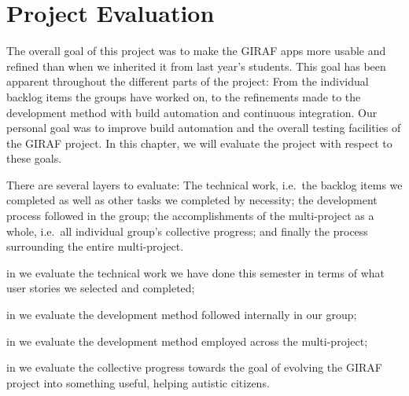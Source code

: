 \chapter{Project Evaluation}\label{chap:evaluation}
The overall goal of this project was to make the GIRAF apps more usable and refined than when we inherited it from last year's students. This goal has been apparent throughout the different parts of the project: From the individual backlog items the groups have worked on, to the refinements made to the development method with build automation and continuous integration. Our personal goal was to improve build automation and the overall testing facilities of the GIRAF project. In this chapter, we will evaluate the project with respect to these goals.

There are several layers to evaluate: The technical work, i.e.\ the backlog items we completed as well as other tasks we completed by necessity; the development process followed in the group; the accomplishments of the multi-project as a whole, i.e.\ all individual group's collective progress; and finally the process surrounding the entire multi-project.

\begin{chapterorganization}
  \item in  we evaluate the technical work we have done this semester in terms of what user stories we selected and completed;
  \item in  we evaluate the development method followed internally in our group;
  \item in  we evaluate the development method employed across the multi-project;
  \item in  we evaluate the collective progress towards the goal of evolving the GIRAF project into something useful, helping autistic citizens.
\end{chapterorganization}

